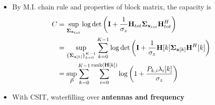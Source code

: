 \documentclass[xcolor=dvipsnames,aspectratio=169]{beamer}
\begin{document}
{\begin{itemize}
\item By M.I. chain rule and properties of block matrix, the capacity is
          \begin{equation}
            \begin{split}
                C&=\sup_{\mathbf{\boldsymbol{\Sigma}}_{\mathbf{x}_{tot}}}\log\det\left(\mathbf{I}+\frac{1}{\sigma_z}\mathbf{H}_{tot}\mathbf{\boldsymbol{\Sigma}}_{\mathbf{x}_{tot}}\mathbf{H}_{tot}^H\right)\\
                 &=\sup_{\{\mathbf{\boldsymbol{\Sigma}}_{\mathbf{x}[k]}\}_{k=0}^{K-1}}\sum_{k=0}^{K-1}\log\det\left(\mathbf{I}+\frac{1}{\sigma_z}\mathbf{H}[k]\mathbf{\boldsymbol{\Sigma}}_{\mathbf{x}[k]}\mathbf{H}^H[k]\right)\\
                 &=\sup_{\vec{P}}\sum_{k=0}^{K-1}\sum_{i=0}^{\textnormal{rank}(\mathbf{H}[k])}\log\left(1+\frac{P_{k,i}\lambda_i[k]}{\sigma_z}\right)
            \end{split}
          \end{equation}
     \item With CSIT, waterfilling over \textbf{antennas and frequency}
    \end{itemize}
}
\end{document}
